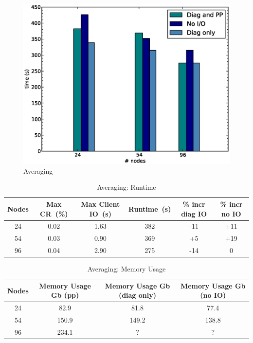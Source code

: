 \normalsize
\begin{figure}[ht!]
  \begin{center}
   \includegraphics[scale=0.4]{figs/ave.eps}
   \caption{Averaging}
   \label{fig:fig1}
  \end{center}
\end{figure}

\begin{table}[ht!]
\scriptsize
  \begin{center}
    \caption{Averaging: Runtime}
    \label{tab:table3}
     \begin{tabular}{|c|c|c|c|c|c|}
      \textbf{Nodes} & \textbf{Max CR~(\%)} & \textbf{Max Client IO~(s)} & \textbf{Runtime~(s)} & \textbf{\% incr diag IO} & \textbf{\% incr no IO}\\
      \hline
      24 & 0.02 & 1.63 & 382 & -11 & +11 \\ 
      54 & 0.03 & 0.90 & 369 & +5 & +19 \\ 
      96 & 0.04 & 2.90 & 275 & -14 & 0 \\ 
    \end{tabular}
  \end{center}
\end{table}

\begin{table}[ht!]
\scriptsize
  \begin{center}
    \caption{Averaging: Memory Usage}
    \label{tab:table4}
     \begin{tabular}{|c|c|c|c|}
      \textbf{Nodes} & \textbf{Memory Usage Gb (pp) } & \textbf{Memory Usage Gb (diag only)} & \textbf{Memory Usage Gb (no IO)} \\
      \hline
      24 & 82.9 & 81.8 & 77.4 \\
      54 & 150.9 & 149.2 & 138.8 \\
      96 & 234.1 & ? & ? \\
    \end{tabular}
  \end{center}
\end{table}


